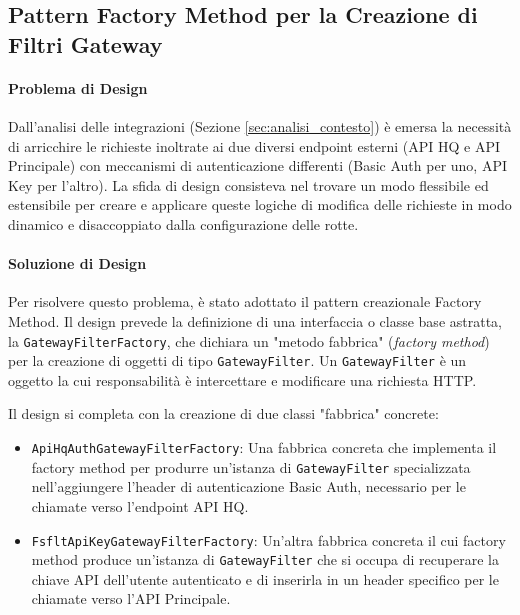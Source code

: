 \documentclass[12pt,a4paper,openright,twoside]{book}
\begin{document}
\subsection{Pattern Factory Method per la Creazione di Filtri Gateway}
\label{subsec:design_factory}

\paragraph{Problema di Design}
Dall'analisi delle integrazioni (Sezione \ref{sec:analisi_contesto}) è emersa la necessità di arricchire le richieste inoltrate ai due diversi endpoint esterni (API HQ e API Principale) con meccanismi di autenticazione differenti (Basic Auth per uno, API Key per l'altro). La sfida di design consisteva nel trovare un modo flessibile ed estensibile per creare e applicare queste logiche di modifica delle richieste in modo dinamico e disaccoppiato dalla configurazione delle rotte.


\paragraph{Soluzione di Design}
Per risolvere questo problema, è stato adottato il pattern creazionale Factory Method. Il design prevede la definizione di una interfaccia o classe base astratta, la \texttt{GatewayFilterFactory}, che dichiara un "metodo fabbrica" (\textit{factory method}) per la creazione di oggetti di tipo \texttt{GatewayFilter}. Un \texttt{GatewayFilter} è un oggetto la cui responsabilità è intercettare e modificare una richiesta HTTP.

Il design si completa con la creazione di due classi "fabbrica" concrete:
\begin{itemize}
    \item \texttt{ApiHqAuthGatewayFilterFactory}: Una fabbrica concreta che implementa il factory method per produrre un'istanza di \texttt{GatewayFilter} specializzata nell'aggiungere l'header di autenticazione Basic Auth, necessario per le chiamate verso l'endpoint API HQ.
    \item \texttt{FsfltApiKeyGatewayFilterFactory}: Un'altra fabbrica concreta il cui factory method produce un'istanza di \texttt{GatewayFilter} che si occupa di recuperare la chiave API dell'utente autenticato e di inserirla in un header specifico per le chiamate verso l'API Principale.
\end{itemize}
\end{document}
